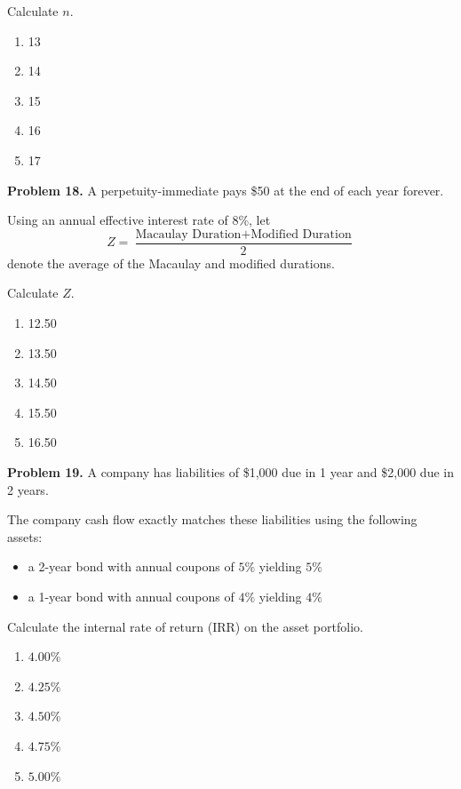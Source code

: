 \documentclass[12pt]{article}
\begin{document}
Calculate $n$.

\vspace{.5cm}

\begin{enumerate}[label = \Alph*.]
\item 13
\item 14
\item 15
\item 16
\item 17
\end{enumerate}

\newpage

\noindent \textbf{Problem 18.}
A perpetuity-immediate pays \$50 at the end of each year forever.

Using an annual effective interest rate of $8\%$, let
\[
Z = \frac{\text{Macaulay Duration}+\text{Modified Duration}}{2}
\]
denote the average of the Macaulay and modified durations.

Calculate $Z$.

\vspace{.5cm}

\begin{enumerate}[label = \Alph*.]
\item 12.50
\item 13.50
\item 14.50
\item 15.50
\item 16.50
\end{enumerate}

\newpage

\noindent \textbf{Problem 19.}
A company has liabilities of \$1{,}000 due in 1 year and \$2{,}000 due in 2 years.

The company cash flow exactly matches these liabilities using the following assets:

\begin{itemize}
\item a 2-year bond with annual coupons of $5\%$ yielding $5\%$
\item a 1-year bond with annual coupons of $4\%$ yielding $4\%$
\end{itemize}

Calculate the internal rate of return (IRR) on the asset portfolio.

\vspace{.5cm}

\begin{enumerate}[label = \Alph*.]
\item $4.00\%$
\item $4.25\%$
\item $4.50\%$
\item $4.75\%$
\item $5.00\%$
\end{enumerate}
\end{document}
